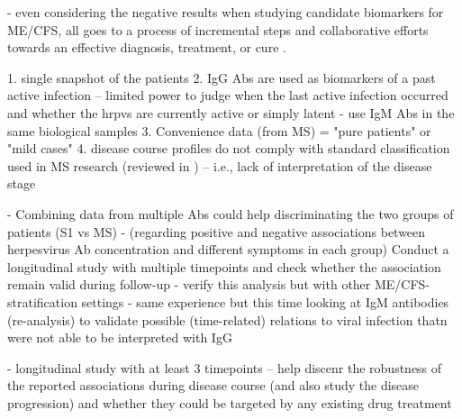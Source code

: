 - even considering the negative results when studying candidate biomarkers for ME/CFS, all goes to a process of incremental steps and collaborative efforts towards an effective diagnosis, treatment, or cure \citep{lacerda2019HopeDisappointment}.


1. single snapshot of the patients
2. IgG Abs are used as biomarkers of a past active infection -- limited power to judge when the last active infection occurred and whether the hrpvs are currently active or simply latent
    - use IgM Abs in the same biological samples
3. Convenience data (from MS) = "pure patients" or "mild cases"
4. disease course profiles do not comply with standard classification used in MS research (reviewed in \citet{klineova2018ClinicalCourse}) -- i.e., lack of interpretation of the disease stage


- Combining data from multiple Abs could help discriminating the two groups of patients (S1 vs MS)
- (regarding positive and negative associations between herpesvirus Ab concentration and different symptoms in each group) Conduct a longitudinal study with multiple timepoints and check whether the association remain valid during follow-up
- verify this analysis but with other ME/CFS-stratification settings
- same experience but this time looking at IgM antibodies (re-analysis) to validate possible (time-related) relations to viral infection thatn were not able to be interpreted with IgG

- longitudinal study with at least 3 timepoints -- help discenr the robustness of the reported associations during disease course (and also study the disease progression) and whether they could be targeted by any existing drug treatment